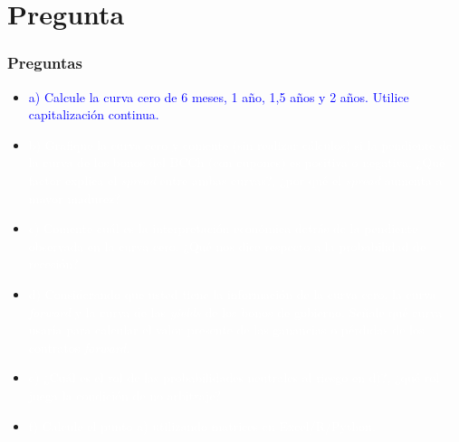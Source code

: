 \documentclass{beamer}
\begin{document}
\section{Pregunta }
  \begin{frame}
    \frametitle{Preguntas}
    \begin{itemize}
      \scriptsize
      \item {\Large\textcolor{blue}{a) Calcule la curva cero de 6 meses, 1 año, 1,5 años y 2 años. Utilice capitalización continua.}}
      \vspace{3pt}
      \item {\textcolor{white}{b) Grafique la curva cero y comente (sin realizar cálculos) si la pendiente de la curva de los bonos del BCCh (con cupones) es positiva o negativa. ¿Qué factor explica el \textit{spread} entre ambas curvas?, ¿por qué el \textit{spread} aumenta a mayor madurez?}}
      \vspace{3pt}
      \item {\textcolor{white}{c) Comente cuál es la interpretación económica detrás de la pendiente observada en la curva cero. ¿Qué nos dice respecto a la probabilidad de recesión?}}
      \vspace{3pt}
      \item {\textcolor{white}{d) Considerando que usted tiene la información de la curva cero, la curva \textit{forward} y la curva de las \textit{yields} de los bonos de gobierno. Señale qué curva usaría para calcular el valor presente de las ganancias o pérdidas de los contratos \textit{forward}.}}
      \vspace{3pt}
      \item {\textcolor{white}{e) ¿Cuál es el rol de las probabilidades neutrales al riesgo en d)?, ¿qué rol juega la condición de no arbitraje?}}
      \vspace{3pt}
      \item {\textcolor{white}{f) Calcule el punto a) utilizando matrices en Excel/R/Python.}}
      \vspace{3pt}
    \end{itemize}
  \end{frame}

\newcommand{\entero}[1]{\pgfmathprintnumber[fixed, precision=0]{#1}}
\newcommand{\decimal}[1]{\pgfmathprintnumber[fixed, precision=2]{#1}}
\newcommand{\decimalx}[1]{\pgfmathprintnumber[fixed, precision=3]{#1}}
\newcommand{\porcentaje}[1]{%
  \pgfmathsetmacro{\temp}{#1*100}%
  \pgfmathprintnumber[fixed, precision=2]{\temp}\%%
}\newcommand{\capcontinuacero}{ F = P \cdot e^{-rT}}
\newcommand{\capcontinua}{F = \sum_{i=1}^{n} \frac{C_i}{e^{r_i t_i}} + \frac{P}{e^{r_n t_n}}}
\end{document}
